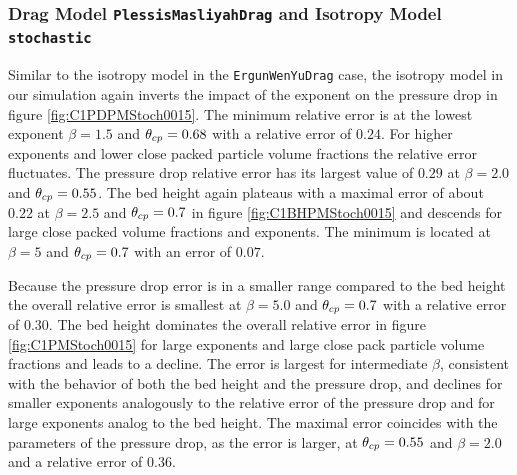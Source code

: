 \subsubsection{Drag Model \lstinline|PlessisMasliyahDrag| and Isotropy Model \lstinline|stochastic|}

Similar to the isotropy model in the \lstinline|ErgunWenYuDrag| case, the isotropy model in our simulation again inverts the impact of the exponent on the pressure drop in figure \ref{fig:C1PDPMStoch0015}.
The minimum relative error is at the lowest exponent $\beta = 1.5$ and $\theta_{cp} = 0.68$ with a relative error of $0.24$.
For higher exponents and lower close packed particle volume fractions the relative error fluctuates.
The pressure drop relative error has its largest value of $0.29$ at $\beta = 2.0$ and $\theta_{cp} = 0.55$.
The bed height again plateaus with a maximal error of about $0.22$ at $\beta = 2.5$ and $\theta_{cp} = 0.7$ in figure \ref{fig:C1BHPMStoch0015} and descends for large close packed volume fractions and exponents. The minimum is located at $\beta = 5$ and $\theta_{cp} = 0.7$ with an error of $0.07$.


Because the pressure drop error is in a smaller range compared to the bed height the overall relative error is smallest at $\beta = 5.0$ and $\theta_{cp} = 0.7$ with a relative error of $0.30$.
The bed height dominates the overall relative error in figure \ref{fig:C1PMStoch0015} for large exponents and large close pack particle volume fractions and leads to a decline. The error is largest for intermediate $\beta$, consistent with the behavior of both the bed height and the pressure drop, and declines for smaller exponents analogously to the relative error of the pressure drop and for large exponents analog to the bed height.
The maximal error coincides with the parameters of the pressure drop, as the error is larger, at $\theta_{cp} = 0.55$ and $\beta = 2.0$ and a relative error of $0.36$. 

